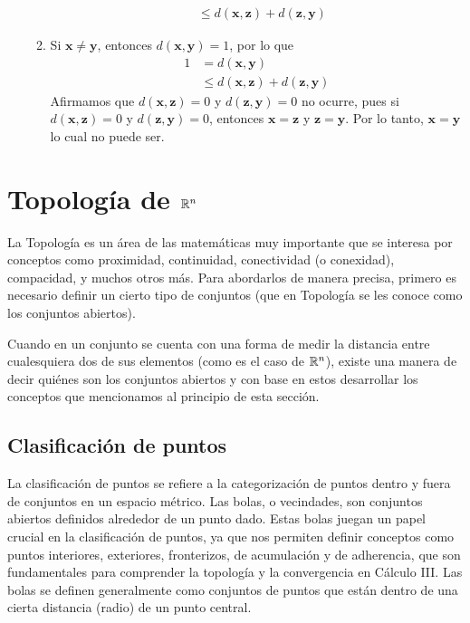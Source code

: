 \begin{example}
\begin{enumerate}[label=\roman*.]
\begin{enumerate}
\begin{align*}
                & \leq d(\mathbf{x}, \mathbf{z}) + d(\mathbf{z}, \mathbf{y})
            \end{align*}
            \item Si $\mathbf{x} \neq \mathbf{y}$, entonces $d(\mathbf{x}, \mathbf{y}) = 1$, por lo que
            \begin{align*}
                1 & = d(\mathbf{x}, \mathbf{y}) \\
                & \leq d(\mathbf{x}, \mathbf{z}) + d(\mathbf{z}, \mathbf{y})
            \end{align*}
            Afirmamos que $d(\mathbf{x}, \mathbf{z}) = 0$ y $d(\mathbf{z}, \mathbf{y}) = 0$ no ocurre, pues si $d(\mathbf{x}, \mathbf{z}) = 0$ y $d(\mathbf{z}, \mathbf{y}) = 0$, entonces $\mathbf{x} = \mathbf{z}$ y $\mathbf{z} = \mathbf{y}$. Por lo tanto, $\mathbf{x} = \mathbf{y}$ lo cual no puede ser.
        \end{enumerate}
    \end{enumerate}
\end{example}

\section{Topología de $\RR[n]$}

La Topología es un área de las matemáticas muy importante que se interesa por conceptos como proximidad, continuidad, conectividad (o conexidad), compacidad, y muchos otros más. Para abordarlos de manera precisa, primero es necesario definir un cierto tipo de conjuntos (que en Topología se les conoce como los conjuntos abiertos).

Cuando en un conjunto se cuenta con una forma de medir la distancia entre cualesquiera dos de sus elementos (como es el caso de $\RR[n]$), existe una manera de decir quiénes son los conjuntos abiertos y con base en estos desarrollar los conceptos que mencionamos al principio de esta sección.

\newpage

\subsection{Clasificación de puntos}

La clasificación de puntos se refiere a la categorización de puntos dentro y fuera de conjuntos en un espacio métrico. Las bolas, o vecindades, son conjuntos abiertos definidos alrededor de un punto dado. Estas bolas juegan un papel crucial en la clasificación de puntos, ya que nos permiten definir conceptos como puntos interiores, exteriores, fronterizos, de acumulación y de adherencia, que son fundamentales para comprender la topología y la convergencia en Cálculo III. Las bolas se definen generalmente como conjuntos de puntos que están dentro de una cierta distancia (radio) de un punto central.

